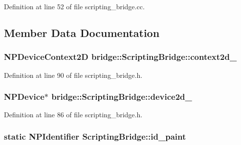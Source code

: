 Definition at line 52 of file scripting\_\-bridge.cc.



\subsection{Member Data Documentation}
\hypertarget{classbridge_1_1_scripting_bridge_ae8d47779a04203f58420dc3d9c88b063}{
\subsubsection[{context2d\_\-}]{\setlength{\rightskip}{0pt plus 5cm}NPDeviceContext2D {\bf bridge::ScriptingBridge::context2d\_\-}}}
\label{classbridge_1_1_scripting_bridge_ae8d47779a04203f58420dc3d9c88b063}


Definition at line 90 of file scripting\_\-bridge.h.

\hypertarget{classbridge_1_1_scripting_bridge_ad3a2e16a43b8a18b888ad880abd472c8}{
\subsubsection[{device2d\_\-}]{\setlength{\rightskip}{0pt plus 5cm}NPDevice$\ast$ {\bf bridge::ScriptingBridge::device2d\_\-}}}
\label{classbridge_1_1_scripting_bridge_ad3a2e16a43b8a18b888ad880abd472c8}


Definition at line 86 of file scripting\_\-bridge.h.

\hypertarget{classbridge_1_1_scripting_bridge_af9fe1c1d57b6fb113b2e0da63128807d}{
\subsubsection[{id\_\-paint}]{\setlength{\rightskip}{0pt plus 5cm}static NPIdentifier {\bf ScriptingBridge::id\_\-paint}}}
\label{classbridge_1_1_scripting_bridge_af9fe1c1d57b6fb113b2e0da63128807d}


